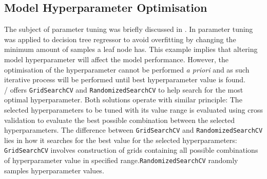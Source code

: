\subsection{Model Hyperparameter Optimisation}\label{sec:hpo}

The subject of parameter tuning was briefly discussed in . In  parameter tuning was applied to decision tree regressor to avoid overfitting by changing the minimum amount of samples a leaf node has. This example implies that altering model hyperparameter will affect the model performance. However, the optimisation of the hyperparameter cannot be performed \emph{a priori} and as such iterative process will be performed until best hyperparameter value is found.\\ 


\scikit/ offers {\tt GridSearchCV} and {\tt RandomizedSearchCV} to help search for the most optimal hyperparameter. Both solutions operate with similar principle: The selected hyperparameters to be tuned with its value range is evaluated using cross validation to evaluate the best possible combination between the selected hyperparameters. The difference between {\tt GridSearchCV} and {\tt RandomizedSearchCV} lies in how it searches for the best value for the selected hyperparameters: {\tt GridSearchCV} involves construction of grids containing all possible combinations of hyperparameter value in specified range.{\tt RandomizedSearchCV} randomly samples hyperparameter values.\\ 

